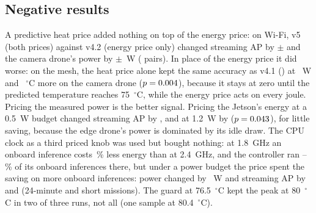 \documentclass[conference]{IEEEtran}
\begin{document}
\subsection{Negative results}\label{sec:negative}
A predictive heat price added nothing on top of the energy price: on Wi-Fi, v5 (both prices) against v4.2 (energy
price only) changed streaming AP by \HeatTopSap{}$\pm$\HeatTopSapCi{} and the camera drone's power by
\HeatTopW{}$\pm$\HeatTopWCi{}~W (\HeatTopPairs{} pairs). In place of the energy price it did worse: on the mesh, the heat
price alone kept the same accuracy as v4.1 (\HeatSap{}) at \HeatW{}~W and \HeatC{}~$^\circ$C more on the camera drone
($p=0.004{}$), because it stays at zero until the predicted temperature reaches 75~$^\circ$C, while the energy price acts
on every joule. Pricing the measured power is the better signal. Pricing the Jetson's energy at a 0.5~W budget changed
streaming AP by \JetHalfSap{}, and at 1.2~W by \JetTwelveSap{} ($p=0.043{}$), for little saving, because the edge drone's power is
dominated by its idle draw. The CPU clock as a third priced knob was used but bought nothing: at 1.8~GHz an onboard
inference costs \BdDvfsSave\,\% less energy than at 2.4~GHz, and the controller ran \BdDvfsShareMin--\BdDvfsShareMax\,\%
of its onboard inferences there, but under a power budget the price spent the saving on more onboard inferences: power
changed by \BdDvfsW~W and streaming AP by \BdDvfsSapHeat{} and \BdDvfsSapShort{} (24-minute and short missions). The
guard at 76.5~$^\circ$C kept the peak at 80~$^\circ$C in two of three runs, not all (one sample at 80.4~$^\circ$C).
\end{document}
